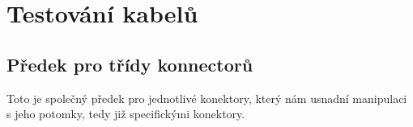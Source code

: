 \section{Testování kabelů}
\newpage
\subsection{Předek pro třídy konnectorů}

Toto je společný předek pro jednotlivé konektory, který nám usnadní manipulaci s jeho potomky, tedy již specifickými konektory.
